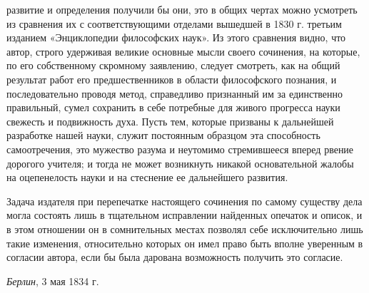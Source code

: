 развитие и определения получили бы они, это в общих чертах можно усмотреть
из сравнения их с соответствующими отделами вышедшей в 1830 г. третьим
изданием «Энциклопедии философских наук». Из этого сравнения видно, что
автор, строго удерживая великие основные мысли своего сочинения, на
которые, по его собственному скромному заявлению, следует смотреть, как на
общий результат работ его предшественников в области философского познания,
и последовательно проводя метод, справедливо признанный им за единственно
правильный, сумел сохранить в себе потребные для живого прогресса науки
свежесть и подвижность духа. Пусть тем, которые призваны к дальнейшей
разработке нашей науки, служит постоянным образцом эта способность
самоотречения, это мужество разума и неутомимо стремившееся вперед рвение
дорогого учителя; и тогда не может возникнуть никакой основательной жалобы
на оцепенелость науки и на стеснение ее дальнейшего развития.

Задача издателя при перепечатке настоящего сочинения по самому существу дела
могла состоять лишь в тщательном исправлении найденных опечаток и описок, и
в этом отношении он в сомнительных местах позволял себе исключительно лишь
такие изменения, относительно которых он имел право быть вполне уверенным в
согласии автора, если бы была дарована возможность получить это согласие.

{\em Берлин}, 3 мая 1834 г.\textstylexxxviii{ }

\clearpage\subsubsection[Примечания]{}
\bigskip


\bigskip


